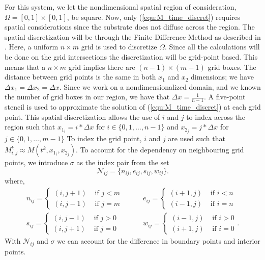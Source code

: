 For this system, we let the nondimensional spatial region of consideration, $\Omega = [0,1]\times [0,1]$, be square.
Now, only (\ref{equ:M_time_discret}) requires spatial considerations since the substrate does not diffuse across the region.
The spatial discretization will be through the Finite Difference Method as described in \cite{saad2003iterativeMethod}.
Here, a uniform $n \times m$ grid is used to discretize $\Omega$.
Since all the calculations will be done on the grid intersections the discretization will be grid-point based.
This means that a $n \times m$ grid implies there are $(n-1) \times (m-1)$ grid boxes.
The distance between grid points is the same in both $x_1$ and $x_2$ dimensions; we have $\Delta x_1 = \Delta x_2 = \Delta x$.
Since we work on a nondimensionalized domain, and we known the number of grid boxes in our region, we have that $\Delta x = \frac{1}{n-1}$.
A five-point stencil is used to approximate the solution of (\ref{equ:M_time_discret}) at each grid point.
This spatial discretization allows the use of $i$ and $j$ to index across the region such that $x_{1_i} = i * \Delta x$ for $i \in \{ 0, 1, \ldots, n-1 \}$ and $x_{2_j} = j * \Delta x$ for $j \in \{ 0, 1, \ldots, m-1 \}$
To index the grid point, $i$ and $j$ are used such that $M^{k}_{i,j} \approx M(t^{k}, x_{1_i}, x_{2_j})$.
To account for the dependency on neighbouring grid points, we introduce $\sigma$ as the index pair from the set 
\begin{equation}\label{equ:neighbour}
  \mathcal{N}_{ij} = \{n_{ij}, e_{ij}, s_{ij}, w_{ij}\}.
\end{equation}
where, 
\begin{equation}
  \begin{aligned}
    n_{ij} = \begin{cases} 
      (i,j+1)  & \text{ if } j < m \\
      (i,j-1)  & \text{ if } j = m \end{cases}
    & \qquad 
    e_{ij} = \begin{cases}
      (i+1,j)  & \text{ if } i < n \\
      (i-1,j)  & \text{ if } i = n \end{cases}
    \\
    s_{ij} = \begin{cases}
      (i,j-1)  & \text{ if } j > 0 \\
      (i,j+1)  & \text{ if } j = 0 \end{cases}
    & \qquad 
    w_{ij} = \begin{cases}
      (i-1,j)  & \text{ if } i > 0\\
      (i+1,j)  & \text{ if } i = 0 \end{cases}.
  \end{aligned}
\end{equation}
With $\mathcal{N}_{ij}$ and $\sigma$ we can account for the difference in boundary points and interior points.

